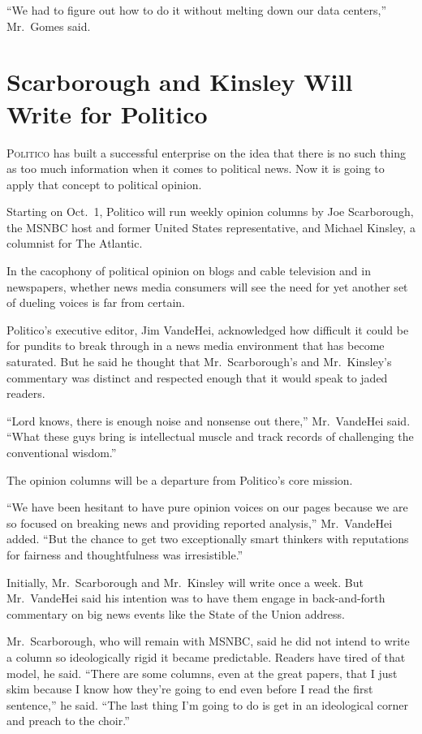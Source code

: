 ﻿\documentclass[12pt]{article}
\begin{document}
``We had to figure out how to do it without melting down our data centers,'' Mr.~Gomes said.

\pagebreak
\section{Scarborough and Kinsley Will Write for Politico}

\lettrine{P}{olitico} has built a successful enterprise on the idea that
there is no such thing as too much information when it comes to political news. Now it is going to
apply that concept to political opinion.

Starting on Oct.~1, Politico will run weekly opinion columns by Joe Scarborough, the MSNBC host and
former United States representative, and Michael Kinsley, a columnist for The Atlantic.

In the cacophony of political opinion on blogs and cable television and in newspapers, whether news
media consumers will see the need for yet another set of dueling voices is far from certain.

Politico's executive editor, Jim VandeHei, acknowledged how difficult it could be for pundits to
break through in a news media environment that has become saturated. But he said he thought that
Mr.~Scarborough's and Mr.~Kinsley's commentary was distinct and respected enough that it would speak
to jaded readers.

``Lord knows, there is enough noise and nonsense out there,'' Mr.~VandeHei said. ``What these guys
bring is intellectual muscle and track records of challenging the conventional wisdom.''

The opinion columns will be a departure from Politico's core mission.

``We have been hesitant to have pure opinion voices on our pages because we are so focused on
breaking news and providing reported analysis,'' Mr.~VandeHei added. ``But the chance to get two
exceptionally smart thinkers with reputations for fairness and thoughtfulness was irresistible.''

Initially, Mr.~Scarborough and Mr.~Kinsley will write once a week. But Mr.~VandeHei said his
intention was to have them engage in back-and-forth commentary on big news events like the State of
the Union address.

Mr.~Scarborough, who will remain with MSNBC, said he did not intend to write a column so
ideologically rigid it became predictable. Readers have tired of that model, he said. ``There are
some columns, even at the great papers, that I just skim because I know how they're going to end
even before I read the first sentence,'' he said. ``The last thing I'm going to do is get in an
ideological corner and preach to the choir.''
\end{document}
